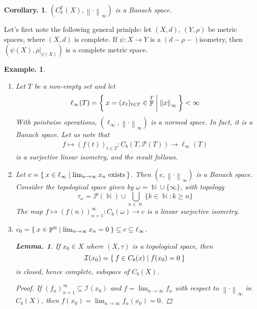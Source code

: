 \documentclass[11pt, a4paper]{memoir}
\DeclareMathOperator{\N}{{\mathbb{N}}}
\DeclareMathOperator{\F}{{\mathbb{F}}}
\newcommand{\norm}[1]{\ensuremath{\left\lVert#1\right\rVert}}
\theoremstyle{change}
\newtheorem{lemma}[theorem]{Lemma.}
\newtheorem{corollary}[theorem]{Corollary.}
\theoremstyle{plain}
\theoremstyle{nonumberplain}
\newtheorem{example}{Example.}
\newtheorem{proof}{Proof}
\numberwithin{equation}{section}
\begin{document}
\begin{corollary}
    $(C_b^{\F}(X),\norm{\cdot}_\infty)$ is a Banach space.
\end{corollary}
Let's first note the following general priniple: let $(X,d)$, $(Y,\rho)$ be metric spaces, where $(X,d)$ is complete.
If $\psi:X\to Y$ is a $(d-\rho-)$isometry, then $(\psi(X),\rho|_{\psi(X)})$ is a complete metric space.
\begin{example}
    \begin{enumerate}[nl,r]
        \item Let $T$ be a non-empty set and let
            \begin{equation*}
                \ell_\infty(T) = \Set{x=(x_t)_{t\in T}\in\F^T | \norm{x}_\infty}<\infty
            \end{equation*}
            With pointwise operations, $(\ell_\infty,\norm{\cdot}_\infty)$ is a normed space.
            In fact, it is a Banach space.
            Let us note that
            \begin{align*}
                f\mapsto (f(t))_{t\in T}:C_b(T,\mathcal{P}(T))\to\ell_\infty(T)
            \end{align*}
            is a surjective linear isometry, and the result follows.
        \item Let $c=\Set{x\in\ell_\infty | \lim_{n\to\infty}x_n\text{ exists}}$.
            Then $(c,\norm{\cdot}_\infty)$ is a Banach space.
            Consider the topological space given by $\omega=\N\cup\{\infty\}$, with topology
            \begin{equation*}
                \tau_\omega=\mathcal{P}(\N)\cup\bigcup_{n\in\N}\{k\in\N:k\geq n\}
            \end{equation*}
            The map $f\mapsto(f(n))_{n=1}^\infty:C_b(\omega)\to c$ is a linear surjective isometry.
        \item $c_0=\Set{x\in\F^{\N} | \lim_{n\to\infty}x_n=0}\subseteq c\subseteq\ell_\infty$.
            \begin{lemma}
                If $x_0\in X$ where $(X,\tau)$ is a topological space, then
                \begin{equation*}
                    \mathcal{I}(x_0)= \Set{f\in C_b(x) | f(x_0)=0}
                \end{equation*}
                is closed, hence complete, subspace of $C_b(X)$.
            \end{lemma}
            \begin{proof}
                If $(f_n)_{n=1}^\infty\subseteq\mathcal{I}(x_0)$ and $f=\lim_{n\to\infty}f_n$ with respect to $\norm{\cdot}_\infty$ in $C_b(X)$, then $f(x_0)=\lim_{n\to\infty}f_n(x_0)=0$.

\end{proof}
\end{enumerate}
\end{example}
\end{document}
